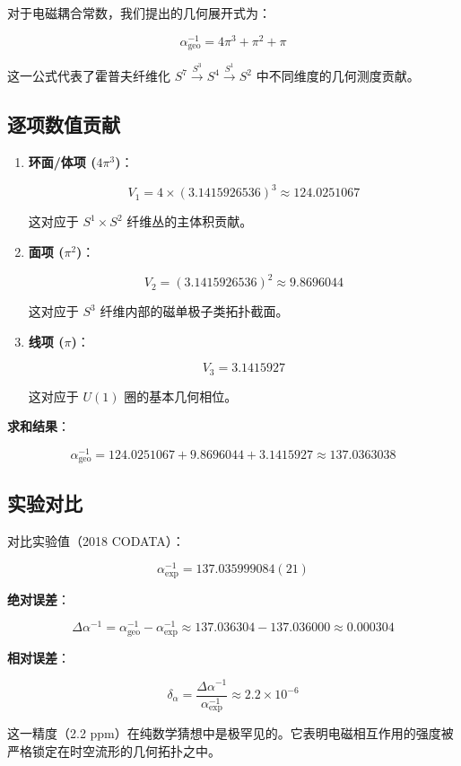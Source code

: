 对于电磁耦合常数，我们提出的几何展开式为：

\[\alpha_{\text{geo}}^{-1} = 4\pi^3 + \pi^2 + \pi\]

这一公式代表了霍普夫纤维化 $S^7 \xrightarrow{S^3} S^4 \xrightarrow{S^1} S^2$ 中不同维度的几何测度贡献。

\subsection{逐项数值贡献}

\begin{enumerate}
\item \textbf{环面/体项 ($4\pi^3$)}：

   \[V_1 = 4 \times (3.1415926536)^3 \approx 124.0251067\]

   这对应于 $S^1 \times S^2$ 纤维丛的主体积贡献。

\item \textbf{面项 ($\pi^2$)}：

   \[V_2 = (3.1415926536)^2 \approx 9.8696044\]

   这对应于 $S^3$ 纤维内部的磁单极子类拓扑截面。

\item \textbf{线项 ($\pi$)}：

   \[V_3 = 3.1415927\]

   这对应于 $U(1)$ 圈的基本几何相位。
\end{enumerate}

\textbf{求和结果}：

\[\alpha_{\text{geo}}^{-1} = 124.0251067 + 9.8696044 + 3.1415927 \approx 137.0363038\]

\subsection{实验对比}

对比实验值（2018 CODATA）：

\[\alpha_{\text{exp}}^{-1} = 137.035999084(21)\]

\textbf{绝对误差}：

\[\Delta \alpha^{-1} = \alpha_{\text{geo}}^{-1} - \alpha_{\text{exp}}^{-1} \approx 137.036304 - 137.036000 \approx 0.000304\]

\textbf{相对误差}：

\[\delta_{\alpha} = \frac{\Delta \alpha^{-1}}{\alpha_{\text{exp}}^{-1}} \approx 2.2 \times 10^{-6}\]

这一精度（2.2 ppm）在纯数学猜想中是极罕见的。它表明电磁相互作用的强度被严格锁定在时空流形的几何拓扑之中。

